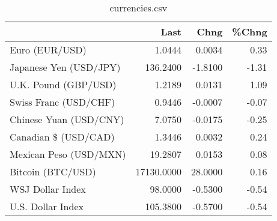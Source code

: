 \documentclass{article}%
\begin{document}
%


\begin{table}[htbp]%
\caption{currencies.csv}%
\centering%
\begin{adjustbox}{width=1\textwidth}%
\begin{tabular}{lrrr}
\toprule
                       &       Last &    Chng &  \%Chng \\
\midrule
        Euro (EUR/USD) &     1.0444 &  0.0034 &   0.33 \\
Japanese Yen (USD/JPY) &   136.2400 & -1.8100 &  -1.31 \\
  U.K. Pound (GBP/USD) &     1.2189 &  0.0131 &   1.09 \\
 Swiss Franc (USD/CHF) &     0.9446 & -0.0007 &  -0.07 \\
Chinese Yuan (USD/CNY) &     7.0750 & -0.0175 &  -0.25 \\
  Canadian \$ (USD/CAD) &     1.3446 &  0.0032 &   0.24 \\
Mexican Peso (USD/MXN) &    19.2807 &  0.0153 &   0.08 \\
     Bitcoin (BTC/USD) & 17130.0000 & 28.0000 &   0.16 \\
      WSJ Dollar Index &    98.0000 & -0.5300 &  -0.54 \\
     U.S. Dollar Index &   105.3800 & -0.5700 &  -0.54 \\
\bottomrule
\end{tabular}
%
\end{adjustbox}%
\end{table}

%
\end{document}
